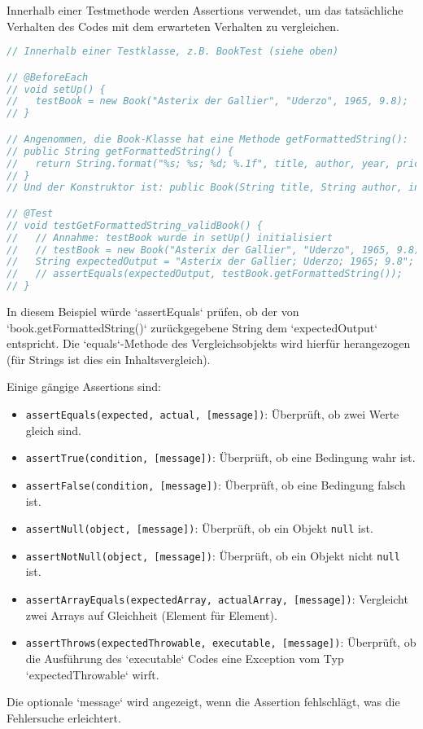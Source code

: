 Innerhalb einer Testmethode werden Assertions verwendet, um das tatsächliche Verhalten des Codes mit dem erwarteten Verhalten zu vergleichen.
\begin{lstlisting}[language=Java, caption={Beispiel einer Testmethode mit Assertions}]
// Innerhalb einer Testklasse, z.B. BookTest (siehe oben)

// @BeforeEach
// void setUp() {
//   testBook = new Book("Asterix der Gallier", "Uderzo", 1965, 9.8);
// }

// Angenommen, die Book-Klasse hat eine Methode getFormattedString():
// public String getFormattedString() {
//   return String.format("%s; %s; %d; %.1f", title, author, year, price);
// }
// Und der Konstruktor ist: public Book(String title, String author, int year, double price)

// @Test
// void testGetFormattedString_validBook() {
//   // Annahme: testBook wurde in setUp() initialisiert
//   // testBook = new Book("Asterix der Gallier", "Uderzo", 1965, 9.8); // Falls kein setUp
//   String expectedOutput = "Asterix der Gallier; Uderzo; 1965; 9.8";
//   // assertEquals(expectedOutput, testBook.getFormattedString());
// }
\end{lstlisting}
In diesem Beispiel würde `assertEquals` prüfen, ob der von `book.getFormattedString()` zurückgegebene String dem `expectedOutput` entspricht. Die `equals`-Methode des Vergleichsobjekts wird hierfür herangezogen (für Strings ist dies ein Inhaltsvergleich).

Einige gängige Assertions sind:
\begin{itemize}
    \item \texttt{assertEquals(expected, actual, [message])}: Überprüft, ob zwei Werte gleich sind.
    \item \texttt{assertTrue(condition, [message])}: Überprüft, ob eine Bedingung wahr ist.
    \item \texttt{assertFalse(condition, [message])}: Überprüft, ob eine Bedingung falsch ist.
    \item \texttt{assertNull(object, [message])}: Überprüft, ob ein Objekt \texttt{null} ist.
    \item \texttt{assertNotNull(object, [message])}: Überprüft, ob ein Objekt nicht \texttt{null} ist.
    \item \texttt{assertArrayEquals(expectedArray, actualArray, [message])}: Vergleicht zwei Arrays auf Gleichheit (Element für Element).
    \item \texttt{assertThrows(expectedThrowable, executable, [message])}: Überprüft, ob die Ausführung des `executable` Codes eine Exception vom Typ `expectedThrowable` wirft.
\end{itemize}
Die optionale `message` wird angezeigt, wenn die Assertion fehlschlägt, was die Fehlersuche erleichtert.

